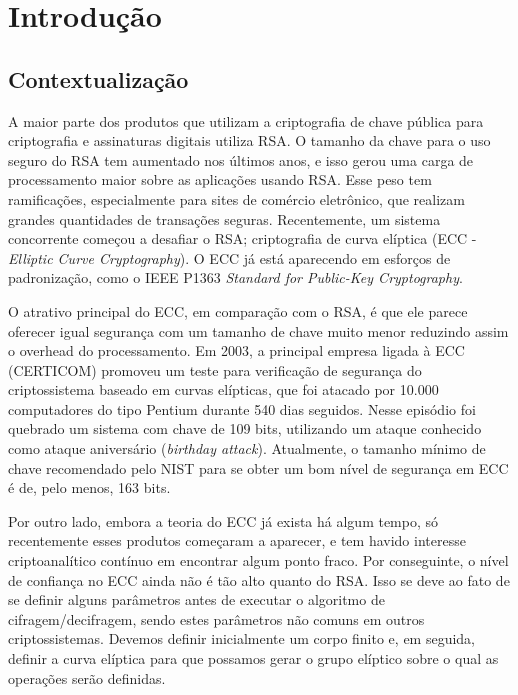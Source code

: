 \chapter*[Introdução]{Introdução}

\section*{Contextualização}
A maior parte dos produtos que utilizam a criptografia de chave pública para criptografia e assinaturas digitais utiliza RSA. O tamanho da chave para o uso seguro do RSA tem aumentado nos últimos anos, e isso gerou uma carga de processamento maior sobre as aplicações usando RSA. Esse peso tem ramificações, especialmente para sites de comércio eletrônico, que realizam grandes quantidades de transações seguras. Recentemente, um sistema concorrente começou a desafiar o RSA; criptografia de curva elíptica (ECC - \textit{Elliptic Curve Cryptography}). O ECC já está aparecendo em esforços de padronização, como o IEEE P1363 \textit{Standard for Public-Key Cryptography}. \cite{Lee:2011}

O atrativo principal do ECC, em comparação com o RSA, é que ele parece oferecer igual segurança com um tamanho de chave muito menor reduzindo assim o overhead do processamento. \cite{Stallings:2011} Em 2003, a principal empresa ligada à ECC (CERTICOM) promoveu um teste para verificação de segurança do criptossistema baseado em curvas elípticas, que foi atacado por 10.000 computadores do tipo Pentium durante 540 dias seguidos. Nesse episódio foi quebrado um sistema com chave de 109 bits, utilizando um ataque conhecido como ataque aniversário (\textit{birthday attack}). Atualmente, o tamanho mínimo de chave recomendado pelo NIST para se obter um bom nível de segurança em ECC é de, pelo menos, 163 bits. \cite{Sangalli:2011}

Por outro lado, embora a teoria do ECC já exista há algum tempo, só recentemente esses produtos começaram a aparecer, e tem havido interesse criptoanalítico contínuo em encontrar algum ponto fraco. Por conseguinte, o nível de confiança no ECC ainda não é tão alto quanto do RSA. \cite{Stallings:2011} Isso se deve ao fato de se definir alguns parâmetros antes de executar o algoritmo de cifragem/decifragem, sendo estes parâmetros não comuns em outros criptossistemas. Devemos definir inicialmente um corpo finito e, em seguida, definir a curva elíptica para que possamos gerar o grupo elíptico sobre o qual as operações serão definidas. \cite{Sangalli:2011}


